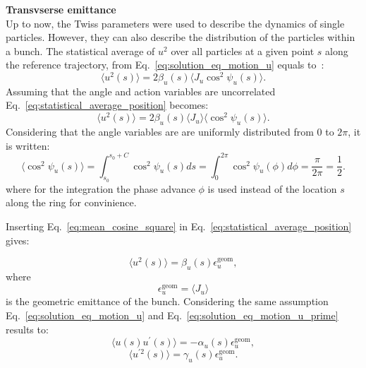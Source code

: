  \textbf{Transvserse emittance}\\
Up to now, the Twiss parameters were used to describe the dynamics of single particles. However, they can also describe the distribution of the particles within a bunch. The statistical average of $u^2$ over all particles at a given point $s$ along the reference trajectory, from Eq.~\eqref{eq:solution_eq_motion_u} equals to~\cite{wolski2014}:
 \begin{equation}\label{eq:statistical_average_position}
     \langle u^2(s) \rangle = 2 \beta_u(s) \langle J_u \cos^2{\psi_u(s)} \rangle.
 \end{equation}
 Assuming that the angle and action variables are uncorrelated Eq.~\eqref{eq:statistical_average_position} becomes:
 \begin{equation}\label{eq:statistical_average_position_2}
     \langle u^2(s) \rangle = 2 \beta_u(s) \langle J_u \rangle \langle \cos^2{\psi_u(s)} \rangle.
 \end{equation}
 Considering that the angle variables are are uniformly distributed from 0 to $2\pi$, it is written: %
 \begin{equation}\label{eq:mean_cosine_square}
     \langle \cos^2{\psi_u(s)} \rangle = \int_{s_0}^{s_0+C} \cos^2{\psi_u(s)} ds =   \int_0^{2\pi} \cos^2{\psi_u(\phi)} d\phi = \frac{\pi}{2\pi} = \frac{1}{2}.
 \end{equation}
 where for the integration the phase advance $\phi$ is used instead of the location $s$ along the ring for convinience. %
 
 Inserting Eq.~\eqref{eq:mean_cosine_square} in Eq.~\eqref{eq:statistical_average_position} gives:
 
 \begin{equation}\label{eq:emittance_definition_1}
     \langle u^2(s) \rangle = \beta_u(s)  \epsilon^{\mathrm{geom}}_u,
 \end{equation}
 where
 \begin{equation}\label{eq:geom_emittance_action}
     \epsilon^{\mathrm{geom}}_u=\langle J_u \rangle
 \end{equation}
 is the geometric emittance of the bunch. Considering the same assumption Eq.~\eqref{eq:solution_eq_motion_u} and  Eq.~\eqref{eq:solution_eq_motion_u_prime} results to:
 \begin{equation}\label{eq:u_uprime_eq_1}
     \langle u(s) u^\prime(s) \rangle = - \alpha_u(s) \epsilon^{\mathrm{geom}}_u,
 \end{equation}
 \begin{equation}\label{eq:u_uprime_eq_2}
     \langle u^{\prime 2}(s) \rangle = \gamma_u(s) \epsilon^{\mathrm{geom}}_u.
 \end{equation}
 
